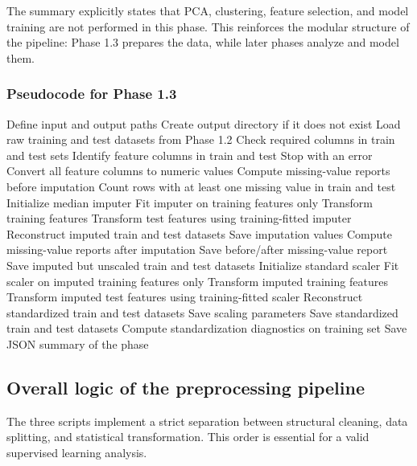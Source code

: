 \documentclass{ipgpmaster}
\begin{document}
The summary explicitly states that PCA, clustering, feature selection, and model training are not performed in this phase. This reinforces the modular structure of the pipeline: Phase 1.3 prepares the data, while later phases analyze and model them.

\subsubsection{Pseudocode for Phase 1.3}

\begin{algorithm}[H]
\caption{Phase 1.3: Imputation and standardization}
\begin{algorithmic}[1]
\State Define input and output paths
\State Create output directory if it does not exist
\State Load raw training and test datasets from Phase 1.2
\State Check required columns in train and test sets
\State Identify feature columns in train and test
    \State Stop with an error
\EndIf
\State Convert all feature columns to numeric values
\State Compute missing-value reports before imputation
\State Count rows with at least one missing value in train and test
\State Initialize median imputer
\State Fit imputer on training features only
\State Transform training features
\State Transform test features using training-fitted imputer
\State Reconstruct imputed train and test datasets
\State Save imputation values
\State Compute missing-value reports after imputation
\State Save before/after missing-value report
\State Save imputed but unscaled train and test datasets
\State Initialize standard scaler
\State Fit scaler on imputed training features only
\State Transform imputed training features
\State Transform imputed test features using training-fitted scaler
\State Reconstruct standardized train and test datasets
\State Save scaling parameters
\State Save standardized train and test datasets
\State Compute standardization diagnostics on training set
\State Save JSON summary of the phase
\end{algorithmic}
\end{algorithm}

\subsection{Overall logic of the preprocessing pipeline}

The three scripts implement a strict separation between structural cleaning, data splitting, and statistical transformation. This order is essential for a valid supervised learning analysis.
\end{document}
